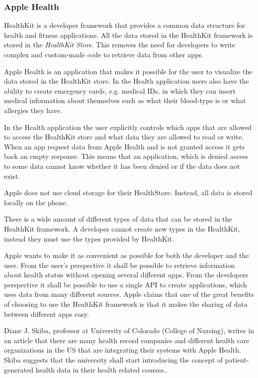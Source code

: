 \documentclass{cslthse-msc}
\begin{document}
\subsubsection{Apple Health}

HealthKit is a developer framework that provides a common data structure for health and fitness applications. All the data stored in the HealthKit framework is stored in the \emph{HealthKit Store}. This removes the need for developers to write complex and custom-made code to retrieve data from other apps.\cite{AppleHealthKitFramework}

Apple Health is an application that makes it possible for the user to visualize the data stored in the HealthKit store. In the Health application users also have the ability to create emergency cards, e.g. medical IDs, in which they can insert medical information about themselves such as what their blood-type is or what allergies they have.

In the Health application the user explicitly controls which apps that are allowed to access the HealthKit store and what data they are allowed to read or write. When an app request data from Apple Health and is not granted access it gets back an empty response. This means that an application, which is denied access to some data cannot know whether it has been denied or if the data does not exist.

Apple does not use cloud storage for their HealthStore. Instead, all data is stored locally on the phone. 

There is a wide amount of different types of data that can be stored in the HealthKit framework. A developer cannot create new types in the HealthKit, instead they must use the types provided by HealthKit. 

Apple wants to make it as convenient as possible for both the developer and the user. From the user's perspective it shall be possible to retrieve information about health status without opening several different apps. From the developers perspective it shall be possible to use a single API to create applications, which uses data from many different sources. Apple claims that one of the great benefits of choosing to use the HealthKit framework is that it makes the sharing of data between different apps easy.

Diane J. Skiba, professor at University of Colorado (College of Nursing), writes in an article that there are many health record companies and different health care organizations in the US that are integrating their systems with Apple Health\cite{skiba2014connected}. Skiba suggests that the university shall start introducing the concept of patient-generated health data in their health related courses.\cite{skiba2014connected}. 
\end{document}
